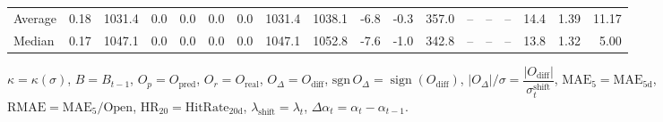 \begin{threeparttable}
{\begin{tabular}{lrrrrrrrrrrrrrrrrr}
Average &     0.18 & 1031.4 &               0.0 &               0.0 &                0.0 &                0.0 & 1031.4 & 1038.1 &       -6.8 &                     -0.3 &               357.0 &         -- &        -- &             -- &             14.4 &            1.39 &                  11.17 \\
 Median &     0.17 & 1047.1 &               0.0 &               0.0 &                0.0 &                0.0 & 1047.1 & 1052.8 &       -7.6 &                     -1.0 &               342.8 &         -- &        -- &             -- &             13.8 &            1.32 &                   5.00 \\
\bottomrule
\end{tabular}
}
\begin{tablenotes}\footnotesize
\item $\kappa=\kappa(\sigma)$, $B=B_{t-1}$, $O_p=O_{\text{pred}}$, $O_r=O_{\text{real}}$, $O_\Delta=O_{\text{diff}}$, $\mathrm{sgn}\,O_\Delta=\operatorname{sign}(O_{\text{diff}})$, $|O_\Delta|/\sigma=\dfrac{|O_{\text{diff}}|}{\sigma_t^{\text{shift}}}$, $\mathrm{MAE}_5=\mathrm{MAE}_{5\text{d}}$, $\mathrm{RMAE}= \mathrm{MAE}_5 / \text{Open}$, $\mathrm{HR}_{20}=\mathrm{HitRate}_{20\text{d}}$, 
$\lambda_{\text{shift}}=\lambda_t$, 
$\Delta\alpha_t=\alpha_t-\alpha_{t-1}$.
\end{tablenotes}
\end{threeparttable}
\endgroup

